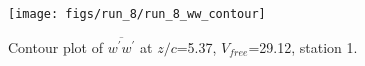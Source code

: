 \begin{figure}[H]
\centering
\texttt{[image: figs/run\_8/run\_8\_ww\_contour]}
\caption{Contour plot of $\overline{w^\prime w^\prime}$ at $z/c$=5.37, $V_{free}$=29.12, station 1.}
\label{fig:run_8_ww_contour}
\end{figure}


